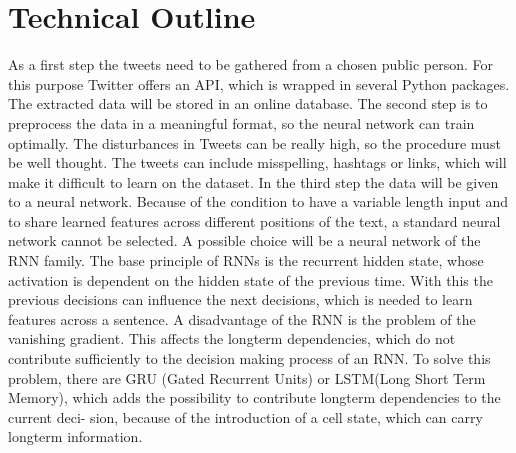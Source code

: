 \documentclass[a4paper,11pt,oneside]{article}
\begin{document}
  \section*{Technical Outline}
  As a first step the tweets need to be gathered from a chosen public person. For this purpose Twitter offers an API, which is wrapped in several Python packages. The extracted data will be stored in an online database.
The second step is to preprocess the data in a meaningful format, so the neural network can train optimally. The disturbances in Tweets can be really high, so the procedure must be well thought. The tweets can include misspelling, hashtags or links, which will make it difficult to learn on the dataset.
In the third step the data will be given to a neural network. Because of the condition to have a variable length input and to share learned features across different positions of the text, a standard neural network cannot be selected. A possible choice will be a neural network of the RNN family. The base principle of RNNs is the recurrent hidden state, whose activation is dependent on the hidden state of the previous time. With this the previous decisions can influence the next decisions, which is needed to learn features across a sentence.
A disadvantage of the RNN is the problem of the vanishing gradient. This affects the longterm
dependencies, which do not contribute sufficiently to the decision making process of an RNN.
To solve this problem, there are GRU (Gated Recurrent Units) or LSTM(Long Short Term
Memory), which adds the possibility to contribute longterm dependencies to the current deci-
sion, because of the introduction of a cell state, which can carry longterm information.
  
\end{document}
